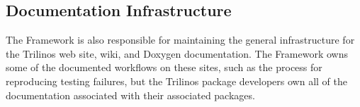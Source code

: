 \subsection{Documentation Infrastructure}

The Framework is also responsible for maintaining the general infrastructure for the Trilinos web site, wiki, and Doxygen documentation. The Framework owns some of the documented workflows on these sites, such as the process for reproducing testing failures, but the Trilinos package developers own all of the documentation associated with their associated packages.






